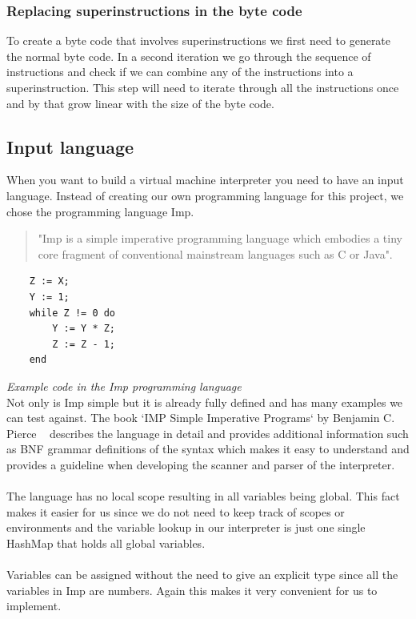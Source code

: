 \documentclass{article}
\begin{document}
\subsubsection{Replacing superinstructions in the byte code}
\label{sec:replacing_superinstructions}
To create a byte code that involves superinstructions we first need to generate
the normal byte code. In a second iteration we go through the sequence of
instructions and check if we can combine any of the instructions into a
superinstruction. This step will need to iterate through all the instructions
once and by that grow linear with the size of the byte code.

\subsection{Input language} %
\label{sec:input_language}
When you want to build a virtual machine interpreter you need to have an
input language. Instead of creating our own programming language for this
project, we chose the programming language Imp. ~\cite{Pierce:SF1}

\begin{quotation}
"Imp is a simple imperative programming language which embodies a tiny core
fragment of conventional mainstream languages such as C or Java". ~\cite{Pierce:SF1}
\end{quotation}

\begin{verbatim}
    Z := X;
    Y := 1;
    while Z != 0 do
        Y := Y * Z;
        Z := Z - 1;
    end
\end{verbatim}
\textit{Example code in the Imp programming language} \\

Not only is Imp simple but it is already fully defined and has many examples we
can test against. The book `IMP Simple Imperative Programs` by Benjamin C.
Pierce ~\cite{Pierce:SF1} describes the language in detail and provides
additional information such as BNF grammar definitions of the syntax which
makes it easy to understand and provides a guideline when developing the
scanner and parser of the interpreter.
\\\\
The language has no local scope resulting in all variables being global. This
fact makes it easier for us since we do not need to keep track of scopes or
environments and the variable lookup in our interpreter is just one single
HashMap that holds all global variables.
\\\\
Variables can be assigned without the need to give an explicit type since all
the variables in Imp are numbers. Again this makes it very convenient for us to
implement.
\end{document}
